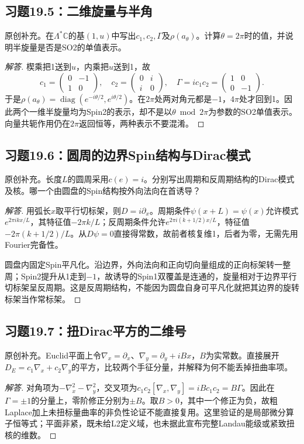 \subsection*{习题19.5：二维旋量与半角}
原创补充。在$\Lambda^*\mathbb C$的基$(1,u)$中写出$c_1,c_2,\Gamma$及$\rho(a_\theta)$。计算$\theta=2\pi$时的值，并说明半旋量是否是SO2的单值表示。
\begin{proof}[解答]
楔乘把1送到$u$，内乘把$u$送到1，故
\[
 c_1=\begin{pmatrix}0&-1\\1&0\end{pmatrix},\quad
 c_2=\begin{pmatrix}0&i\\i&0\end{pmatrix},\quad
 \Gamma=ic_1c_2=\begin{pmatrix}1&0\\0&-1\end{pmatrix}.
\]
于是$\rho(a_\theta)=\operatorname{diag}(e^{-i\theta/2},e^{i\theta/2})$。在$2\pi$处两对角元都是$-1$，$4\pi$处才回到1。因此两个一维半旋量均为Spin2的表示，却不是以$\theta\bmod2\pi$为参数的SO2单值表示。向量共轭作用仍在$2\pi$返回恒等，两种表示不要混淆。
\end{proof}

\subsection*{习题19.6：圆周的边界Spin结构与Dirac模式}
原创补充。长度$L$的圆周采用$c(e)=i$。分别写出周期和反周期结构的Dirac模式及核。哪一个由圆盘的Spin结构按外向法向在首诱导？
\begin{proof}[解答]
用弧长$x$取平行切标架，则$D=i\partial_x$。周期条件$\psi(x+L)=\psi(x)$允许模式$e^{2\pi ikx/L}$，其特征值$-2\pi k/L$；反周期条件允许$e^{2\pi i(k+1/2)x/L}$，特征值$-2\pi(k+1/2)/L$。从$D\psi=0$直接得常数，故前者核复维1，后者为零，无需先用Fourier完备性。

圆盘内固定Spin平凡化。沿边界，外向法向和正向切向量组成的正向标架转一整周；Spin2提升从1走到$-1$，故诱导的Spin1双覆盖是连通的，旋量相对于边界平行切标架呈反周期。这是反周期结构，不能因为圆盘自身可平凡化就把其边界的旋转标架当作常标架。
\end{proof}

\subsection*{习题19.7：扭Dirac平方的二维号}
原创补充。Euclid平面上令$\nabla_x=\partial_x$、$\nabla_y=\partial_y+iBx$，$B$为实常数。直接展开$D_E=c_1\nabla_x+c_2\nabla_y$的平方，比较两个手征分量，并解释为何不能丢掉扭曲率项。
\begin{proof}[解答]
对角项为$-\nabla_x^2-\nabla_y^2$，交叉项为$c_1c_2[\nabla_x,\nabla_y]=iBc_1c_2=B\Gamma$。因此在$\Gamma=\pm1$的分量上，零阶修正分别为$\pm B$。取$B>0$，其中一个修正为负，故粗Laplace加上未扭标量曲率的非负性论证不能直接复用。这里验证的是局部微分算子恒等式；平面非紧，既未给L2定义域，也未据此宣布完整Landau能级或紧致扭核的维数。
\end{proof}

